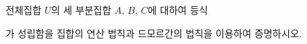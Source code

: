 전체집합 $U$의 세 부분집합 $A$, $B$, $C$에 대하여 등식 \par\smallskip{}\par\smallskip\noindent 가 성립함을 집합의 연산 법칙과 드모르간의 법칙을 이용하여 증명하시오.
